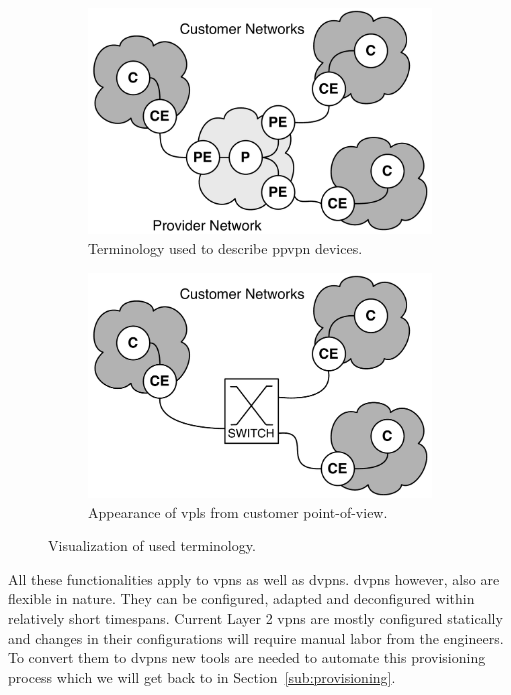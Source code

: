 \begin{figure}[!h]
	\centering
	\begin{subfigure}[h]{0.45\textwidth}
	\centering
		\includegraphics[width=\textwidth]{./includes/ppvpn.pdf}
		\caption{Terminology used to describe \acs{ppvpn} devices.}
		\label{fig:ppvpn}
	\end{subfigure}\hfill
	\begin{subfigure}[h]{0.45\textwidth}
	\centering
		\includegraphics[width=\textwidth]{./includes/ppvpn-cust.pdf}
		\caption{Appearance of \acs{vpls} from customer point-of-view.}
		\label{fig:ppvpn-cust}
	\end{subfigure}
	\caption{Visualization of used terminology.}
\end{figure}

All these functionalities apply to \acp{vpn} as well as \acp{dvpn}. \acp{dvpn} however, also are flexible in nature. They can be configured, adapted and deconfigured within relatively short timespans. Current Layer 2 \acp{vpn} are mostly configured statically and changes in their configurations will require manual labor from the engineers. To convert them to \acp{dvpn} new tools are needed to automate this provisioning process which we will get back to in Section~\ref{sub:provisioning}.

